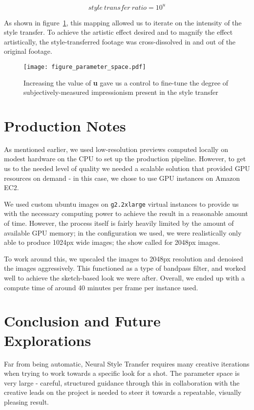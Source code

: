 \documentclass{acmsiggraph}
\begin{document}
\begin{equation}
style\ transfer\ ratio = 10^u
\end{equation}

As shown in figure~\ref{fig:parameter_space}, this mapping allowed us to iterate on the intensity of the style transfer. To achieve the artistic effect desired and to magnify the effect artistically, the style-transferred footage was cross-dissolved in and out of the original footage.

\begin{figure}[ht]
  \centering
  \texttt{[image: figure\_parameter\_space.pdf]}
  \caption{Increasing the value of \textbf{u} gave us a control to fine-tune the degree of subjectively-measured impressionism present in the style transfer}
  \label{fig:parameter_space}
\end{figure}

\section{Production Notes}
As mentioned earlier, we used low-resolution previews computed locally on modest hardware on the CPU to set up the production pipeline. However, to get us to the needed level of quality we needed a scalable solution that provided GPU resources on demand - in this case, we chose to use GPU instances on Amazon EC2.

We used custom ubuntu images on \texttt{g2.2xlarge} virtual instances to provide us with the necessary computing power to achieve the result in a reasonable amount of time. However, the process itself is fairly heavily limited by the amount of available GPU memory; in the configuration we used, we were realistically only able to produce 1024px wide images; the show called for 2048px images.

To work around this, we upscaled the images to 2048px resolution and denoised the images aggressively. This functioned as a type of bandpass filter, and worked well to achieve the sketch-based look we were after. Overall, we ended up with a compute time of around 40 minutes per frame per instance used.

\section{Conclusion and Future Explorations}
Far from being automatic, Neural Style Transfer requires many creative iterations when trying to work towards a specific look for a shot. The parameter space is very large - careful, structured guidance through this in collaboration with the creative leads on the project is needed to steer it towards a repeatable, visually pleasing result.
\end{document}
